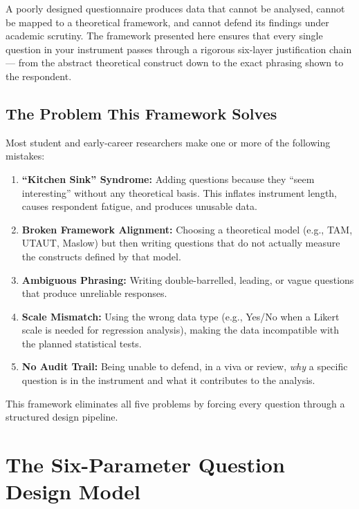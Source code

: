 \documentclass[12pt,a4paper]{article}
\begin{document}
A poorly designed questionnaire produces data that cannot be analysed, cannot be mapped to a theoretical framework, and cannot defend its findings under academic scrutiny. The framework presented here ensures that every single question in your instrument passes through a rigorous six-layer justification chain --- from the abstract theoretical construct down to the exact phrasing shown to the respondent.

\subsection{The Problem This Framework Solves}

Most student and early-career researchers make one or more of the following mistakes:

\begin{enumerate}[leftmargin=1.5em, itemsep=6pt]
    \item \textbf{``Kitchen Sink'' Syndrome:} Adding questions because they ``seem interesting'' without any theoretical basis. This inflates instrument length, causes respondent fatigue, and produces unusable data.
    \item \textbf{Broken Framework Alignment:} Choosing a theoretical model (e.g., TAM, UTAUT, Maslow) but then writing questions that do not actually measure the constructs defined by that model.
    \item \textbf{Ambiguous Phrasing:} Writing double-barrelled, leading, or vague questions that produce unreliable responses.
    \item \textbf{Scale Mismatch:} Using the wrong data type (e.g., Yes/No when a Likert scale is needed for regression analysis), making the data incompatible with the planned statistical tests.
    \item \textbf{No Audit Trail:} Being unable to defend, in a viva or review, \textit{why} a specific question is in the instrument and what it contributes to the analysis.
\end{enumerate}

This framework eliminates all five problems by forcing every question through a structured design pipeline.

\newpage

\section{The Six-Parameter Question Design Model}
\end{document}
